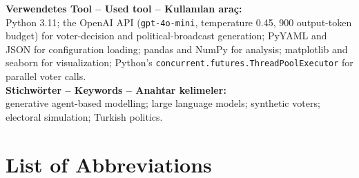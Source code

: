\documentclass[12pt,a4paper]{report}
\begin{document}
\noindent\textbf{Verwendetes Tool – Used tool – Kullanılan araç:}\\
Python 3.11; the OpenAI API (\texttt{gpt-4o-mini}, temperature 0.45, 900 output-token budget) for voter-decision and political-broadcast generation; PyYAML and JSON for configuration loading; pandas and NumPy for analysis; matplotlib and seaborn for visualization; Python's \texttt{concurrent.futures.ThreadPoolExecutor} for parallel voter calls.\\[0.3cm]

\noindent\textbf{Stichwörter – Keywords – Anahtar kelimeler:}\\
generative agent-based modelling; large language models; synthetic voters; electoral simulation; Turkish politics.

\clearpage

\listoftables
{}
\clearpage

\listoffigures
{}
\clearpage

\chapter*{List of Abbreviations}
\end{document}
